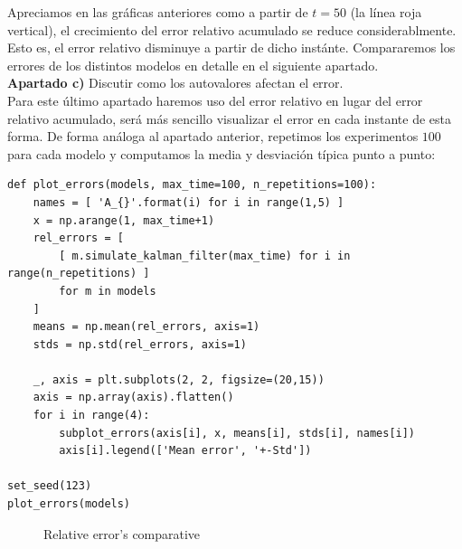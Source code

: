 \documentclass[a4paper]{article}
\begin{document}
Apreciamos en las gráficas anteriores como a partir de $t=50$ (la línea roja vertical), el crecimiento del error relativo acumulado se reduce considerablmente. Esto es, el error relativo disminuye a partir de dicho instánte. Compararemos los errores de los distintos modelos en detalle en el siguiente apartado. \\

\textbf{Apartado c)} Discutir como los autovalores afectan el error. \\

Para este último apartado haremos uso del error relativo en lugar del error relativo acumulado, será más sencillo visualizar el error en cada instante de esta forma. De forma análoga al apartado anterior, repetimos los experimentos $100$ para cada modelo y computamos la media y desviación típica punto a punto:

\begin{verbatim}
def plot_errors(models, max_time=100, n_repetitions=100):
	names = [ 'A_{}'.format(i) for i in range(1,5) ]
	x = np.arange(1, max_time+1)
	rel_errors = [
		[ m.simulate_kalman_filter(max_time) for i in range(n_repetitions) ]
		for m in models
	]
	means = np.mean(rel_errors, axis=1)
	stds = np.std(rel_errors, axis=1)
	
	_, axis = plt.subplots(2, 2, figsize=(20,15))  
	axis = np.array(axis).flatten()
	for i in range(4):
		subplot_errors(axis[i], x, means[i], stds[i], names[i])
		axis[i].legend(['Mean error', '+-Std'])

set_seed(123)
plot_errors(models)
\end{verbatim}

\begin{figure}[H]
	\centering
	\caption{Relative error's comparative}
\end{figure}
\end{document}

